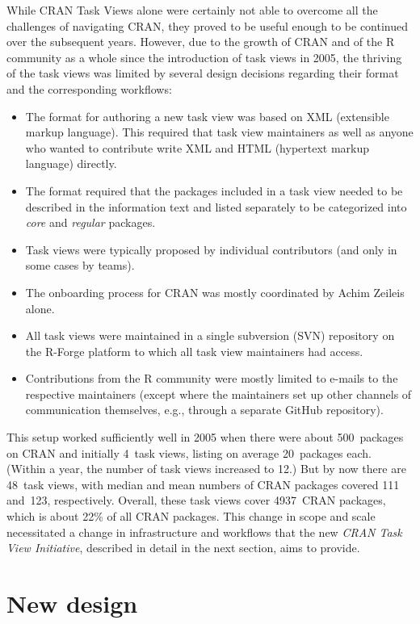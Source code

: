 While CRAN Task Views alone were certainly not able to overcome all the challenges of
navigating CRAN, they proved to be useful enough to be continued over the subsequent
years. However, due to the growth of CRAN \citep[see, e.g.,][]{cran} and of the R community as a whole
since the introduction of task views in 2005, the thriving of the task views
was limited by several design decisions regarding their format and the corresponding
workflows:

\begin{itemize}
\tightlist
\item
  The format for authoring a new task view was based on XML (extensible markup
  language). This required that task view maintainers as well as anyone who wanted to
  contribute write XML and HTML (hypertext markup language) directly.
\item
  The format required that the packages included in a task view needed to be
  described in the information text and listed separately to be categorized
  into \emph{core} and \emph{regular} packages.
\item
  Task views were typically proposed by individual contributors (and only in some cases
  by teams).
\item
  The onboarding process for CRAN was mostly coordinated by Achim Zeileis alone.
\item
  All task views were maintained in a single subversion (SVN) repository on the
  R-Forge platform \citep{rforge} to which all task view maintainers had access.
\item
  Contributions from the R community were mostly limited to e-mails to the respective
  maintainers (except where the maintainers set up other channels of communication
  themselves, e.g., through a separate GitHub repository).
\end{itemize}

This setup worked sufficiently well in 2005 when there were about 500~packages on CRAN and
initially 4~task views, listing on average 20~packages each. (Within a year, the
number of task views increased to 12.)
But by now there are 48~task views, with median and mean numbers of CRAN
packages covered 111 and~123, respectively.
Overall, these task views cover 4937~CRAN packages,
which is about 22\% of all CRAN packages.
This change in scope and scale necessitated a change in infrastructure and workflows
that the new \emph{CRAN Task View Initiative}, described in detail in the next section,
aims to provide.

\section{New design}\label{new-design}

